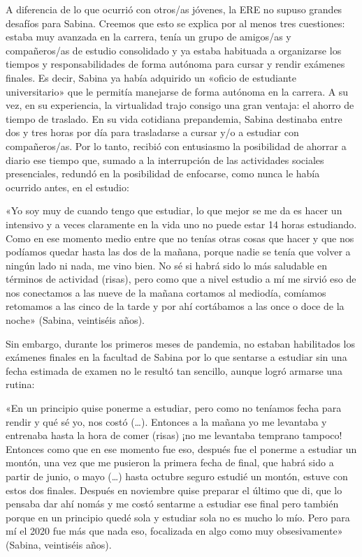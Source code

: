 \begin{refsection}
A diferencia de lo que ocurrió con otros/as jóvenes, la ERE no supuso grandes desafíos para Sabina. Creemos que esto se explica por al menos tres cuestiones: estaba muy avanzada en la carrera, tenía un grupo de amigos/as y compañeros/as de estudio consolidado y ya estaba habituada a organizarse los tiempos y responsabilidades de forma autónoma para cursar y rendir exámenes finales. Es decir, Sabina ya había adquirido un «oficio de estudiante universitario» \protect\parencite{4194-BRACCHI2016} que le permitía manejarse de forma autónoma en la carrera. A su vez, en su experiencia, la virtualidad trajo consigo una gran ventaja: el ahorro de tiempo de traslado. En su vida cotidiana prepandemia, Sabina destinaba entre dos y tres horas por día para trasladarse a cursar y/o a estudiar con compañeros/as. Por lo tanto, recibió con entusiasmo la posibilidad de ahorrar a diario ese tiempo que, sumado a la interrupción de las actividades sociales presenciales, redundó en la posibilidad de enfocarse, como nunca le había ocurrido antes, en el estudio:


\begin{gbcita}
«Yo soy muy de cuando tengo que estudiar, lo que mejor se me da es hacer un intensivo y a veces claramente en la vida uno no puede estar 14 horas estudiando. Como en ese momento medio entre que no tenías otras cosas que hacer y que nos podíamos quedar hasta las dos de la mañana, porque nadie se tenía que volver a ningún lado ni nada, me vino bien. No sé si habrá sido lo más saludable en términos de actividad (risas), pero como que a nivel estudio a mí me sirvió eso de nos conectamos a las nueve de la mañana cortamos al mediodía, comíamos retomamos a las cinco de la tarde y por ahí cortábamos a las once o doce de la noche» (Sabina, veintiséis años).

\end{gbcita}

Sin embargo, durante los primeros meses de pandemia, no estaban habilitados los exámenes finales en la facultad de Sabina por lo que sentarse a estudiar sin una fecha estimada de examen no le resultó tan sencillo, aunque logró armarse una rutina:


\begin{gbcita}
«En un principio quise ponerme a estudiar, pero como no teníamos fecha para rendir y qué sé yo, nos costó (…). Entonces a la mañana yo me levantaba y entrenaba hasta la hora de comer (risas) ¡no me levantaba temprano tampoco! Entonces como que en ese momento fue eso, después fue el ponerme a estudiar un montón, una vez que me pusieron la primera fecha de final, que habrá sido a partir de junio, o mayo (…) hasta octubre seguro estudié un montón, estuve con estos dos finales. Después en noviembre quise preparar el último que di, que lo pensaba dar ahí nomás y me costó sentarme a estudiar ese final pero también porque en un principio quedé sola y estudiar sola no es mucho lo mío. Pero para mí el 2020 fue más que nada eso, focalizada en algo como muy obsesivamente» (Sabina, veintiséis años).


\end{gbcita}
\end{refsection}
